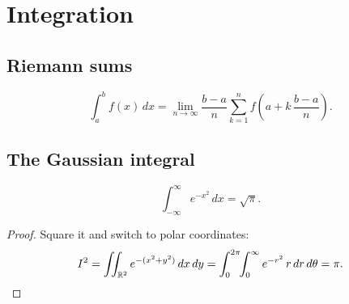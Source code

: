 \documentclass[11pt,oneside,openany]{book}
\begin{document}
\chapter{Integration}
\section{Riemann sums}
\[ \int_a^b f(x)\,dx = \lim_{n\to\infty} \frac{b-a}{n} \sum_{k=1}^{n} f\!\left(a + k\,\frac{b-a}{n}\right). \]
\section{The Gaussian integral}
\[ \int_{-\infty}^{\infty} e^{-x^2}\,dx = \sqrt{\pi}. \]
\begin{proof} Square it and switch to polar coordinates:
\[ I^2 = \iint_{\mathbb{R}^2} e^{-(x^2+y^2)}\,dx\,dy = \int_0^{2\pi}\!\!\int_0^{\infty} e^{-r^2}\,r\,dr\,d\theta = \pi. \qedhere \]
\end{proof}
\end{document}
